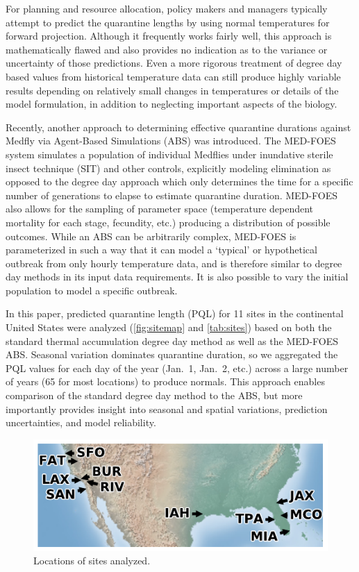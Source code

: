 \documentclass[10pt,a4paper,twocolumn]{article}
\begin{document}
For planning and resource allocation, policy makers and managers 
typically attempt to predict the quarantine lengths by using
normal temperatures for forward projection. 
Although it frequently works fairly well,
this approach is mathematically flawed 
and also provides no indication as to the variance or uncertainty
of those predictions.
Even a more rigorous treatment of degree day based values from
historical temperature data can still produce highly variable results
depending on relatively small changes in temperatures or details of
the model formulation\cite{Roltsch1999}, in addition to neglecting
important aspects of the biology.

Recently, another approach to determining effective quarantine 
durations against Medfly via Agent-Based Simulations (ABS)\cite{manoukis_agent-based_2014}
was introduced. 
The MED-FOES system simulates a population of individual Medflies 
under inundative sterile insect technique (SIT) and other controls, 
explicitly modeling elimination as opposed to the degree day 
approach which only determines the time for a specific
number of generations to elapse to estimate quarantine duration.
MED-FOES also allows for the sampling of parameter space
(temperature dependent mortality for each stage, fecundity, etc.)
producing a distribution of possible outcomes.
While an ABS can be arbitrarily complex, MED-FOES is parameterized
in such a way that it can model a `typical' or hypothetical outbreak from only hourly temperature data,
and is therefore similar to degree day methods in its input data requirements.
It is also possible to vary the initial population to model a specific outbreak.

In this paper, predicted quarantine length (PQL) 
for 11 sites in the continental United States were analyzed
(\autoref{fig:sitemap} and \autoref{tab:sites})
based on both the standard thermal accumulation degree day method\cite{ECY:ECY1969503514} 
as well as the MED-FOES ABS\cite{manoukis_computer_2014}. 
Seasonal variation dominates quarantine duration, 
so we aggregated the PQL values for each day of the year 
(Jan.\ 1, Jan.\ 2, etc.) 
across a large number of years (65 for most locations) to produce normals.
This approach enables comparison of the standard degree day 
method to the ABS, but more importantly provides insight 
into seasonal and spatial variations, prediction uncertainties, 
and model reliability.


\begin{figure}[htb!]
\centering
\includegraphics{figs/sitemap.pdf}
\caption{\label{fig:sitemap}Locations of sites analyzed.}
\end{figure}
\end{document}
